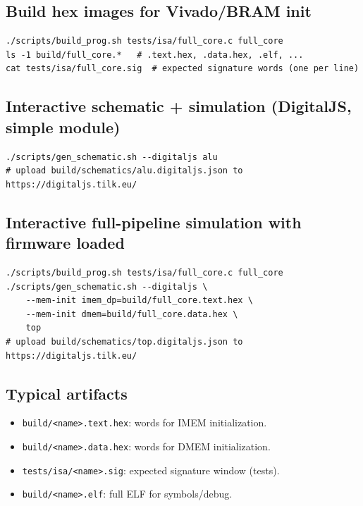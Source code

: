 \subsection{Build hex images for Vivado/BRAM init}
\begin{lstlisting}[style=minrv]
./scripts/build_prog.sh tests/isa/full_core.c full_core
ls -1 build/full_core.*   # .text.hex, .data.hex, .elf, ...
cat tests/isa/full_core.sig  # expected signature words (one per line)
\end{lstlisting}

\subsection{Interactive schematic + simulation (DigitalJS, simple module)}
\begin{lstlisting}[style=minrv]
./scripts/gen_schematic.sh --digitaljs alu
# upload build/schematics/alu.digitaljs.json to https://digitaljs.tilk.eu/
\end{lstlisting}

\subsection{Interactive full-pipeline simulation with firmware loaded}
\begin{lstlisting}[style=minrv]
./scripts/build_prog.sh tests/isa/full_core.c full_core
./scripts/gen_schematic.sh --digitaljs \
    --mem-init imem_dp=build/full_core.text.hex \
    --mem-init dmem=build/full_core.data.hex \
    top
# upload build/schematics/top.digitaljs.json to https://digitaljs.tilk.eu/
\end{lstlisting}

\subsection{Typical artifacts}
\begin{itemize}[leftmargin=*]
  \item \texttt{build/<name>.text.hex}: words for IMEM initialization.
  \item \texttt{build/<name>.data.hex}: words for DMEM initialization.
  \item \texttt{tests/isa/<name>.sig}: expected signature window (tests).
  \item \texttt{build/<name>.elf}: full ELF for symbols/debug.
\end{itemize}
